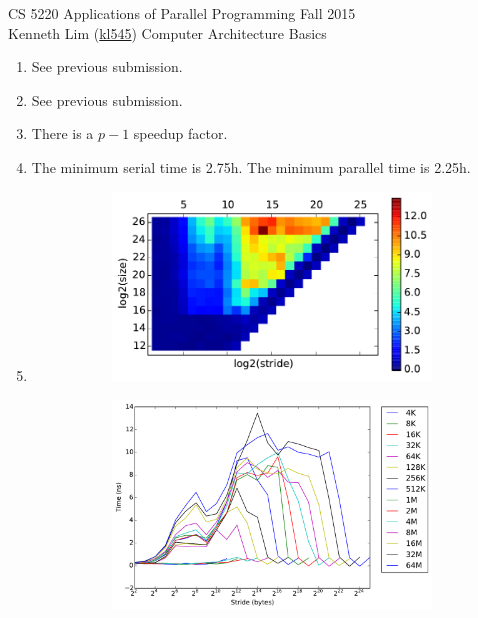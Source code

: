 \documentclass{scrartcl}
\begin{document}
  \begin{framed}
  \large
  CS 5220 Applications of Parallel Programming \hfill Fall 2015 \\
  Kenneth Lim (\href{mailto:kl545@cornell.edu}{kl545}) \hfill Computer Architecture Basics \hspace{-3ex}
  \end{framed}
  \begin{enumerate}
    \item See previous submission.
    \item See previous submission.
    \item There is a $p-1$ speedup factor.
    \item The minimum serial time is 2.75h. The minimum parallel time is 2.25h.
    \item
      \begin{figure}[ht!]
        \centering
        \begin{subfigure}[c]{.5\textwidth}
          \centering
          \includegraphics{local-timings-heat}
        \end{subfigure}%
        \begin{subfigure}[c]{.5\textwidth}
          \centering
          \includegraphics{local-timings-line}

\end{subfigure}
\end{figure}
\end{enumerate}
\end{document}
